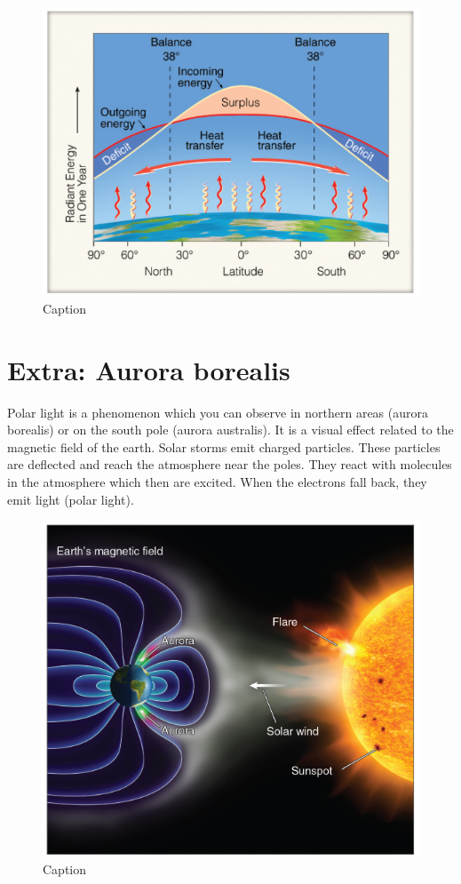 \documentclass[oneside]{book}
\begin{document}
\begin{figure}

{\centering \includegraphics[width=0.7\linewidth]{figures/Figure143} 

}

\caption{Caption}\label{fig:EnergyBudget5}
\end{figure}

\section{Extra: Aurora borealis}\label{extra-aurora-borealis}

Polar light is a phenomenon which you can observe in northern areas
(aurora borealis) or on the south pole (aurora australis). It is a
visual effect related to the magnetic field of the earth. Solar storms
emit charged particles. These particles are deflected and reach the
atmosphere near the poles. They react with molecules in the atmosphere
which then are excited. When the electrons fall back, they emit light
(polar light).

\begin{figure}

{\centering \includegraphics[width=0.5\linewidth]{figures/Figure144} 

}

\caption{Caption}\label{fig:borealis}
\end{figure}
\end{document}

